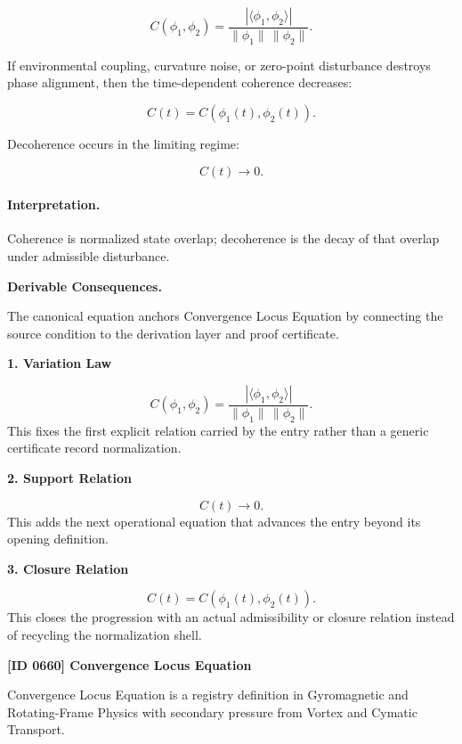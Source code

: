 \begin{equation}
C(\phi_1,\phi_2)
=
\frac{
|\langle \phi_1,\phi_2\rangle|
}{
\|\phi_1\|\,\|\phi_2\|
}.
\end{equation}

If environmental coupling, curvature noise, or zero-point disturbance destroys phase alignment, then the time-dependent coherence decreases:

\begin{equation}
C(t)
=
C(\phi_1(t),\phi_2(t)).
\end{equation}

Decoherence occurs in the limiting regime:

\begin{equation}
\boxed{
C(t)\rightarrow 0 .
}
\end{equation}

\paragraph{Interpretation.}
Coherence is normalized state overlap; decoherence is the decay of that overlap under admissible disturbance.

\par\vspace{0.35em}
\noindent\textbf{Derivable Consequences.}\quad
\begingroup
\footnotesize
\raggedright
The canonical equation anchors Convergence Locus Equation by connecting the source condition to the derivation layer and proof certificate.
\par\endgroup

\noindent\textbf{1. Variation Law}\par
\[
C(\phi_1,\phi_2) = \frac{ |\langle \phi_1,\phi_2\rangle| }{ \|\phi_1\|\,\|\phi_2\| }.
\]
\noindent This fixes the first explicit relation carried by the entry rather than a generic certificate record normalization.\par
\noindent\textbf{2. Support Relation}\par
\[
C(t)\rightarrow 0.
\]
\noindent This adds the next operational equation that advances the entry beyond its opening definition.\par
\noindent\textbf{3. Closure Relation}\par
\[
C(t) = C(\phi_1(t),\phi_2(t)).
\]
\noindent This closes the progression with an actual admissibility or closure relation instead of recycling the normalization shell.\par

\clearpage
\noindent\textbf{[ID 0660] Convergence Locus Equation}\par
\vspace{0.35em}
\begingroup\small
{}
Convergence Locus Equation is a registry definition in Gyromagnetic and Rotating-Frame Physics with secondary pressure from Vortex and Cymatic Transport.

